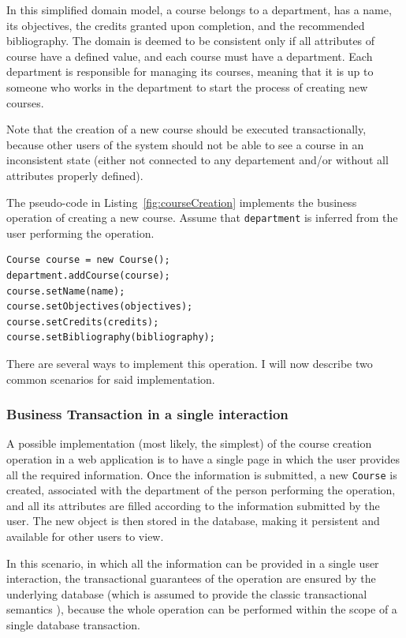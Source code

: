 \documentclass{llncs}
\begin{document}
In this simplified domain model, a course belongs to a department, has
a name, its objectives, the credits granted upon completion, and the
recommended bibliography. The domain is deemed to be consistent only
if all attributes of course have a defined value, and each course must
have a department. Each department is responsible for managing its
courses, meaning that it is up to someone who works in the department
to start the process of creating new courses.

Note that the creation of a new course should be executed
transactionally, because other users of the system should not be able
to see a course in an inconsistent state (either not connected to any
departement and/or without all attributes properly defined).

The pseudo-code in Listing~\ref{fig:courseCreation} implements the
business operation of creating a new course. Assume that
\texttt{department} is inferred from the user performing the
operation.

\begin{lstlisting}[float, caption={Pseudo-Code for the creation of a
    new course. A new Course is created, associated with its
    department, and its attributes are filled.},
  label={fig:courseCreation}]
Course course = new Course();
department.addCourse(course);
course.setName(name);
course.setObjectives(objectives);
course.setCredits(credits);
course.setBibliography(bibliography);
\end{lstlisting}

There are several ways to implement this operation. I will now
describe two common scenarios for said implementation.

\subsubsection{Business Transaction in a single interaction}

A possible implementation (most likely, the simplest) of the course
creation operation in a web application is to have a single page in
which the user provides all the required information. Once the
information is submitted, a new \texttt{Course} is created, associated
with the department of the person performing the operation, and all
its attributes are filled according to the information submitted by
the user. The new object is then stored in the database, making it
persistent and available for other users to view.

In this scenario, in which all the information can be provided in a
single user interaction, the transactional guarantees of the operation
are ensured by the underlying database (which is assumed to provide
the classic transactional semantics \cite{gray1981transaction}),
because the whole operation can be performed within the scope of a
single database transaction.
\end{document}
